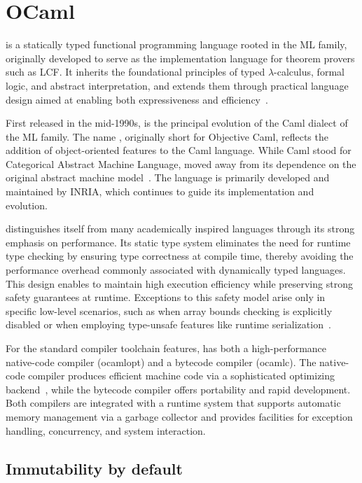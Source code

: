 \section{OCaml}
\label{sec:OCaml}

\ocaml is a statically typed functional programming language rooted in the ML family, originally developed 
to serve as the implementation language for theorem provers such as LCF. It inherits the foundational principles 
of typed $\lambda$-calculus, formal logic, and abstract interpretation, and extends them through practical language design 
aimed at enabling both expressiveness and efficiency~\cite{FilliatrePereiraSousa2018}.

First released in the mid-1990s, \ocaml is the principal evolution of the Caml dialect of the ML family. The name \ocaml, 
originally short for Objective Caml, reflects the addition of object-oriented features to the Caml language. While Caml 
stood for Categorical Abstract Machine Language, \ocaml moved away from its dependence on the original abstract machine 
model~\cite{leroy:inria-00070049}. The language is primarily developed and maintained by INRIA, which continues to guide 
its implementation and evolution.

\ocaml distinguishes itself from many academically inspired languages through its strong emphasis on performance. Its static 
type system eliminates the need for runtime type checking by ensuring type correctness at compile time, thereby avoiding the 
performance overhead commonly associated with dynamically typed languages. This design enables \ocaml to maintain high 
execution efficiency while preserving strong safety guarantees at runtime. Exceptions to this safety model arise only in 
specific low-level scenarios, such as when array bounds checking is explicitly disabled or when employing type-unsafe features 
like runtime serialization~\cite{FilliatrePereiraSousa2018}.

For the standard compiler toolchain features, \ocaml has both a high-performance native-code compiler (\textsf{ocamlopt}) and a 
bytecode compiler (\textsf{ocamlc}). The native-code compiler produces efficient machine code via a sophisticated optimizing 
backend~\cite{abs-1011-1783}, while the bytecode compiler offers portability and rapid development. Both compilers are integrated 
with a runtime system that supports automatic memory management via a garbage collector and provides facilities for exception handling, 
concurrency, and system interaction.

\subsection{Immutability by default}

